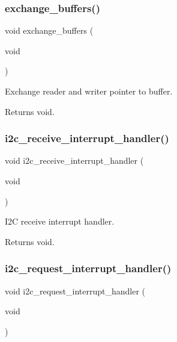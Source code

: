 \subsubsection{\texorpdfstring{exchange\+\_\+buffers()}{exchange\_buffers()}}
{\footnotesize\ttfamily void exchange\+\_\+buffers (\begin{DoxyParamCaption}\item[{void}]{ }\end{DoxyParamCaption})}



Exchange reader and writer pointer to buffer. 

\begin{DoxyReturn}{Returns}
void. 
\end{DoxyReturn}
\mbox{\label{i2c-th_8h_a7f81fcf39717baf18f2e7c2eee2051ae}} 
\subsubsection{\texorpdfstring{i2c\+\_\+receive\+\_\+interrupt\+\_\+handler()}{i2c\_receive\_interrupt\_handler()}}
{\footnotesize\ttfamily void i2c\+\_\+receive\+\_\+interrupt\+\_\+handler (\begin{DoxyParamCaption}\item[{void}]{ }\end{DoxyParamCaption})}



I2C receive interrupt handler. 

\begin{DoxyReturn}{Returns}
void. 
\end{DoxyReturn}
\mbox{\label{i2c-th_8h_ac1da31566bf05976ecb87372278a1ea8}} 
\subsubsection{\texorpdfstring{i2c\+\_\+request\+\_\+interrupt\+\_\+handler()}{i2c\_request\_interrupt\_handler()}}
{\footnotesize\ttfamily void i2c\+\_\+request\+\_\+interrupt\+\_\+handler (\begin{DoxyParamCaption}\item[{void}]{ }\end{DoxyParamCaption})}



